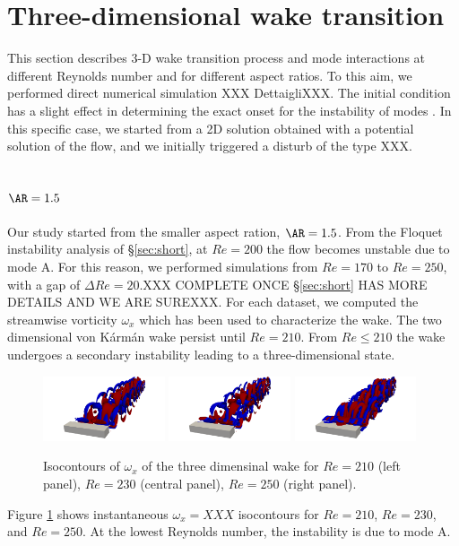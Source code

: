 \section{Three-dimensional wake transition }
 
This section describes 3-D wake transition process and mode interactions at different Reynolds number and for different aspect ratios. To this aim, we performed direct numerical simulation XXX DettaigliXXX. The initial condition has a slight effect in determining the exact onset for the instability of modes \cite{jiang-cheng-an-2018}. In this specific case, we started from a 2D solution obtained with a potential solution of the flow, and we initially triggered a disturb of the type XXX. 

\subsection{$\AR=1.5$}



Our study started from the smaller aspect ration, $\AR=1.5$. From the Floquet instability analysis of \S \ref{sec:short}, at $Re=200$ the flow becomes unstable due to mode A. For this reason, we performed simulations from $Re=170$ to $Re=250$, with a gap of $\Delta Re=20$.XXX COMPLETE ONCE \S \ref{sec:short} HAS MORE DETAILS AND WE ARE SUREXXX. For each dataset, we computed the streamwise vorticity $\omega_x$ which has been used to characterize the wake. The two dimensional von Kármán wake persist until $Re=210$. From $Re \leq 210$ the wake undergoes a secondary instability leading to a three-dimensional state.

\begin{figure}
  \centering
  \includegraphics[trim={12cm 0 12cm 0},clip,width=0.32\textwidth]{./fig/Wake/AR1.5Re210.png}   
  \includegraphics[trim={12cm 0 12cm 0},clip,width=0.32\textwidth]{./fig/Wake/AR1.5Re230.png} 
  \includegraphics[trim={12cm 0 12cm 0},clip,width=0.32\textwidth]{./fig/Wake/AR1.5Re250.png}
  \caption{Isocontours of $\omega_x$ of the three dimensinal wake for $Re=210$ (left panel), $Re=230$  (central panel), $Re=250$ (right panel).}
  \label{fig:wake1.5}
\end{figure}  

 Figure \ref{fig:wake1.5} shows instantaneous $\omega_x=XXX$ isocontours for $Re=210$, $Re=230$, and $Re=250$. At the lowest Reynolds number, the instability is due to mode A.


